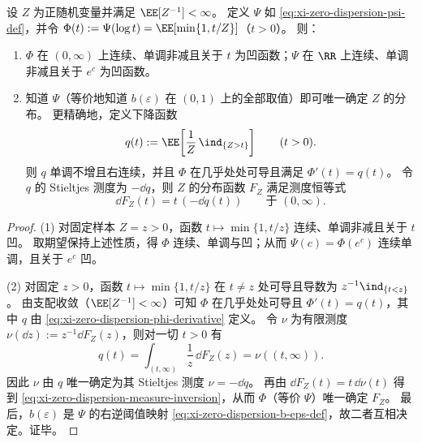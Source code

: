 \begin{theorem}\label{thm:xi-zero-dispersion-identifiability}
设 \(Z\) 为正随机变量并满足 \(\EE[Z^{-1}]<\infty\)。
定义 \(\Psi\) 如 \eqref{eq:xi-zero-dispersion-psi-def}，并令 \(\Phi(t):=\Psi(\log t)=\EE[\min\{1,t/Z\}]\)（\(t>0\)）。
则：
\begin{enumerate}
  \item \(\Phi\) 在 \((0,\infty)\) 上连续、单调非减且关于 \(t\) 为凹函数；\(\Psi\) 在 \(\RR\) 上连续、单调非减且关于 \(e^c\) 为凹函数。
  \item 知道 \(\Psi\)（等价地知道 \(b(\varepsilon)\) 在 \((0,1)\) 上的全部取值）即可唯一确定 \(Z\) 的分布。
        更精确地，定义下降函数
        \begin{equation}\label{eq:xi-zero-dispersion-phi-derivative}
        q(t):=\EE\!\left[\frac{1}{Z}\,\ind_{\{Z>t\}}\right]\qquad(t>0).
        \end{equation}
        则 \(q\) 单调不增且右连续，并且 \(\Phi\) 在几乎处处可导且满足 \(\Phi'(t)=q(t)\)。
        令 \(q\) 的 Stieltjes 测度为 \(-\dd q\)，则 \(Z\) 的分布函数 \(F_Z\) 满足测度恒等式
        \begin{equation}\label{eq:xi-zero-dispersion-measure-inversion}
        \dd F_Z(t)=t\,(-\dd q(t))\qquad\text{于 }(0,\infty).
        \end{equation}
\end{enumerate}
\end{theorem}
\begin{proof}
(1) 对固定样本 \(Z=z>0\)，函数 \(t\mapsto \min\{1,t/z\}\) 连续、单调非减且关于 \(t\) 凹。
取期望保持上述性质，得 \(\Phi\) 连续、单调与凹；从而 \(\Psi(c)=\Phi(e^c)\) 连续单调，且关于 \(e^c\) 凹。
\par
(2) 对固定 \(z>0\)，函数 \(t\mapsto \min\{1,t/z\}\) 在 \(t\neq z\) 处可导且导数为 \(z^{-1}\ind_{\{t<z\}}\)。
由支配收敛（\(\EE[Z^{-1}]<\infty\)）可知 \(\Phi\) 在几乎处处可导且 \(\Phi'(t)=q(t)\)，其中 \(q\) 由 \eqref{eq:xi-zero-dispersion-phi-derivative} 定义。
令 \(\nu\) 为有限测度 \(\nu(\dd z):=z^{-1}\dd F_Z(z)\)，则对一切 \(t>0\) 有
\[
q(t)=\int_{(t,\infty)}\frac{1}{z}\,\dd F_Z(z)=\nu((t,\infty)).
\]
因此 \(\nu\) 由 \(q\) 唯一确定为其 Stieltjes 测度 \(\nu=-\dd q\)。
再由 \(\dd F_Z(t)=t\,\dd\nu(t)\) 得到 \eqref{eq:xi-zero-dispersion-measure-inversion}，从而 \(\Phi\)（等价 \(\Psi\)）唯一确定 \(F_Z\)。
最后，\(b(\varepsilon)\) 是 \(\Psi\) 的右逆阈值映射 \eqref{eq:xi-zero-dispersion-b-eps-def}，故二者互相决定。证毕。
\end{proof}

